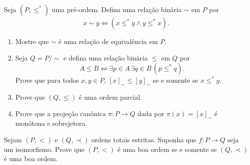 \begin{exercise}[$\BST$]\label{exr:preOrdemQuocienteIsomorfismo}
    Seja $(P, \leq^*)$ uma pré-ordem.
    Defina uma relação binária $\sim$ em $P$ por
    \[
    x \sim y \iff (x \leq^* y \land y \leq^* x).
    \]
    \begin{enumerate}[label=(\alph*)]
        \item Mostre que $\sim$ é uma relação de equivalência em $P$.
        \item Seja $Q=P/{\sim}$ e defina uma relação binária $\leq$ em $Q$ por
        \[
        A \leq B \iff \exists p \in A\, \exists q \in B\, (p \leq^* q).
        \]
        Prove que para todos $x, y \in P$, $[x]_{\sim} \leq [y]_{\sim}$ se e somente se $x \leq^* y$.
        \item Prove que $(Q, \leq)$ é uma ordem parcial.
        \item Prove que a projeção canônica $\pi: P \to Q$ dada por $\pi(x) = [x]_{\sim}$ é monótona e sobrejetora.
    \end{enumerate}
\end{exercise}

\begin{exercise}[$\BST$]
    Sejam $(P,<)$ e $(Q,\prec)$ ordens totais estritas.
    Suponha que $f:P\to Q$ seja um isomorfismo.
    Prove que $(P,<)$ é uma boa ordem se e somente se $(Q,\prec)$ é uma boa ordem.
\end{exercise}
